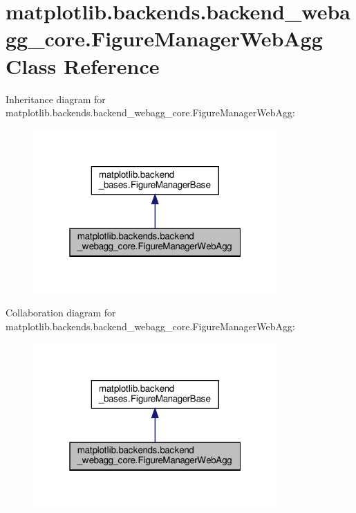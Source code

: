 \hypertarget{classmatplotlib_1_1backends_1_1backend__webagg__core_1_1FigureManagerWebAgg}{}\section{matplotlib.\+backends.\+backend\+\_\+webagg\+\_\+core.\+Figure\+Manager\+Web\+Agg Class Reference}
\label{classmatplotlib_1_1backends_1_1backend__webagg__core_1_1FigureManagerWebAgg}


Inheritance diagram for matplotlib.\+backends.\+backend\+\_\+webagg\+\_\+core.\+Figure\+Manager\+Web\+Agg\+:
\nopagebreak
\begin{figure}[H]
\begin{center}
\leavevmode
\includegraphics[width=265pt]{classmatplotlib_1_1backends_1_1backend__webagg__core_1_1FigureManagerWebAgg__inherit__graph}
\end{center}
\end{figure}


Collaboration diagram for matplotlib.\+backends.\+backend\+\_\+webagg\+\_\+core.\+Figure\+Manager\+Web\+Agg\+:
\nopagebreak
\begin{figure}[H]
\begin{center}
\leavevmode
\includegraphics[width=265pt]{classmatplotlib_1_1backends_1_1backend__webagg__core_1_1FigureManagerWebAgg__coll__graph}
\end{center}
\end{figure}

